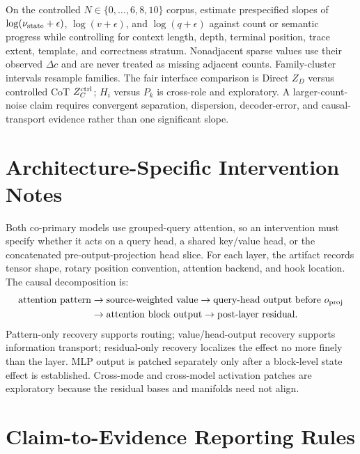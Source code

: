 On the controlled \(N\in\{0,\ldots,6,8,10\}\) corpus, estimate prespecified
slopes of \(\log(\nu_{\rm state}+\epsilon)\),
\(\log(v+\epsilon)\), and \(\log(q+\epsilon)\) against count or semantic
progress while controlling for context length, depth, terminal position,
trace extent, template, and correctness stratum. Nonadjacent sparse values use
their observed \(\Delta c\) and are never treated as missing adjacent counts.
Family-cluster intervals resample families. The fair interface comparison is
Direct \(Z_D\) versus controlled CoT \(Z_C^{\rm ctrl}\); \(H_i\) versus \(P_k\)
is cross-role and exploratory. A larger-count-noise claim requires convergent
separation, dispersion, decoder-error, and causal-transport evidence rather
than one significant slope.

\section{Architecture-Specific Intervention Notes}
\label{app:architecture}

Both co-primary models use grouped-query attention, so an intervention must specify whether it acts on a query head, a shared key/value head, or the concatenated pre-output-projection head slice. For each layer, the artifact records tensor shape, rotary position convention, attention backend, and hook location. The causal decomposition is:
\[
\begin{aligned}
\text{attention pattern}
&\rightarrow
\text{source-weighted value}
\rightarrow
\text{query-head output before }o_{\rm proj}\\
&\rightarrow
\text{attention block output}
\rightarrow
\text{post-layer residual}.
\end{aligned}
\]
Pattern-only recovery supports routing; value/head-output recovery supports information transport; residual-only recovery localizes the effect no more finely than the layer. MLP output is patched separately only after a block-level state effect is established. Cross-mode and cross-model activation patches are exploratory because the residual bases and manifolds need not align.

\section{Claim-to-Evidence Reporting Rules}
\label{app:rules}

